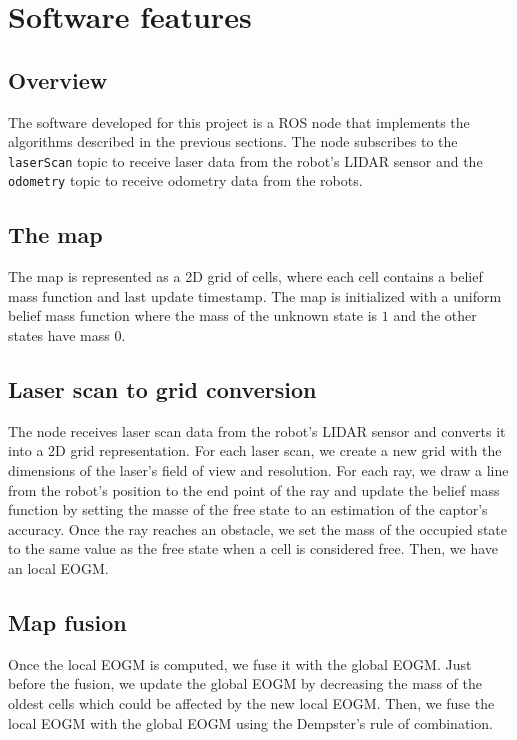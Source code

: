 \section{Software features}

\subsection{Overview}

The software developed for this project is a ROS node that implements the algorithms described in the previous sections.
The node subscribes to the \texttt{laserScan} topic to receive laser data from the robot's LIDAR sensor and the \texttt{odometry} topic to receive odometry data from the robots.

\subsection{The map}

The map is represented as a 2D grid of cells, where each cell contains a belief mass function and last update timestamp.
The map is initialized with a uniform belief mass function where the mass of the unknown state is $1$ and the other states have mass $0$.


\subsection{Laser scan to grid conversion}

The node receives laser scan data from the robot's LIDAR sensor and converts it into a 2D grid representation.
For each laser scan, we create a new grid with the dimensions of the laser's field of view and resolution.
For each ray, we draw a line from the robot's position to the end point of the ray and update the belief mass function by setting the masse of the free state to an estimation of the captor's accuracy.
Once the ray reaches an obstacle, we set the mass of the occupied state to the same value as the free state when a cell is considered free.
Then, we have an local EOGM.

\subsection*{Map fusion}

Once the local EOGM is computed, we fuse it with the global EOGM.
Just before the fusion, we update the global EOGM by decreasing the mass of the oldest cells which could be affected by the new local EOGM.
Then, we fuse the local EOGM with the global EOGM using the Dempster's rule of combination.

